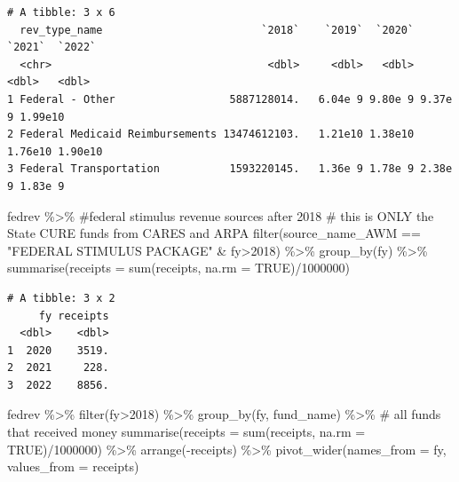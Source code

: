 \documentclass[
  letterpaper,
  DIV=11,
  numbers=noendperiod]{scrreport}
\newenvironment{Shaded}{\begin{snugshade}}{\end{snugshade}}
\newcommand{\AttributeTok}[1]{\textcolor[rgb]{0.40,0.45,0.13}{#1}}
\newcommand{\CommentTok}[1]{\textcolor[rgb]{0.37,0.37,0.37}{#1}}
\newcommand{\ConstantTok}[1]{\textcolor[rgb]{0.56,0.35,0.01}{#1}}
\newcommand{\DecValTok}[1]{\textcolor[rgb]{0.68,0.00,0.00}{#1}}
\newcommand{\FunctionTok}[1]{\textcolor[rgb]{0.28,0.35,0.67}{#1}}
\newcommand{\NormalTok}[1]{\textcolor[rgb]{0.00,0.23,0.31}{#1}}
\newcommand{\SpecialCharTok}[1]{\textcolor[rgb]{0.37,0.37,0.37}{#1}}
\newcommand{\StringTok}[1]{\textcolor[rgb]{0.13,0.47,0.30}{#1}}
\begin{document}
\begin{verbatim}
# A tibble: 3 x 6
  rev_type_name                         `2018`    `2019`  `2020`  `2021`  `2022`
  <chr>                                  <dbl>     <dbl>   <dbl>   <dbl>   <dbl>
1 Federal - Other                  5887128014.   6.04e 9 9.80e 9 9.37e 9 1.99e10
2 Federal Medicaid Reimbursements 13474612103.   1.21e10 1.38e10 1.76e10 1.90e10
3 Federal Transportation           1593220145.   1.36e 9 1.78e 9 2.38e 9 1.83e 9
\end{verbatim}

\begin{Shaded}
\begin{Highlighting}[]
\NormalTok{fedrev }\SpecialCharTok{\%\textgreater{}\%} 
  \CommentTok{\#federal stimulus revenue sources after 2018}
  \CommentTok{\# this is ONLY the State CURE funds from CARES and ARPA}
  \FunctionTok{filter}\NormalTok{(source\_name\_AWM }\SpecialCharTok{==} \StringTok{"FEDERAL STIMULUS PACKAGE"} \SpecialCharTok{\&}\NormalTok{ fy}\SpecialCharTok{\textgreater{}}\DecValTok{2018}\NormalTok{) }\SpecialCharTok{\%\textgreater{}\%}
  \FunctionTok{group\_by}\NormalTok{(fy) }\SpecialCharTok{\%\textgreater{}\%} 
  \FunctionTok{summarise}\NormalTok{(}\AttributeTok{receipts =} \FunctionTok{sum}\NormalTok{(receipts, }\AttributeTok{na.rm =} \ConstantTok{TRUE}\NormalTok{)}\SpecialCharTok{/}\DecValTok{1000000}\NormalTok{)}
\end{Highlighting}
\end{Shaded}

\begin{verbatim}
# A tibble: 3 x 2
     fy receipts
  <dbl>    <dbl>
1  2020    3519.
2  2021     228.
3  2022    8856.
\end{verbatim}

\begin{Shaded}
\begin{Highlighting}[]
\NormalTok{fedrev }\SpecialCharTok{\%\textgreater{}\%} 
  \FunctionTok{filter}\NormalTok{(fy}\SpecialCharTok{\textgreater{}}\DecValTok{2018}\NormalTok{) }\SpecialCharTok{\%\textgreater{}\%}
  \FunctionTok{group\_by}\NormalTok{(fy, fund\_name) }\SpecialCharTok{\%\textgreater{}\%}  \CommentTok{\# all funds that received money}
  \FunctionTok{summarise}\NormalTok{(}\AttributeTok{receipts =} \FunctionTok{sum}\NormalTok{(receipts, }\AttributeTok{na.rm =} \ConstantTok{TRUE}\NormalTok{)}\SpecialCharTok{/}\DecValTok{1000000}\NormalTok{) }\SpecialCharTok{\%\textgreater{}\%}
  \FunctionTok{arrange}\NormalTok{(}\SpecialCharTok{{-}}\NormalTok{receipts) }\SpecialCharTok{\%\textgreater{}\%}
  \FunctionTok{pivot\_wider}\NormalTok{(}\AttributeTok{names\_from =}\NormalTok{ fy, }\AttributeTok{values\_from =}\NormalTok{ receipts)}
\end{Highlighting}
\end{Shaded}
\end{document}
